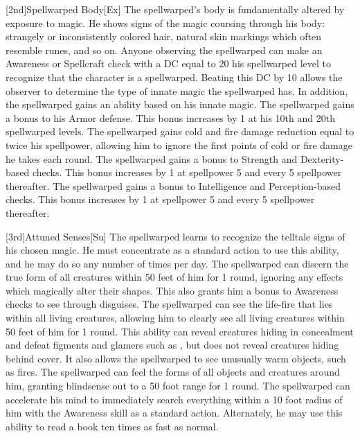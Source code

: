 [2nd]{Spellwarped Body}[Ex]
The spellwarped's body is fundamentally altered by exposure to magic.
He shows signs of the magic coursing through his body: strangely or inconsistently colored hair, natural skin markings which often resemble runes, and so on.
Anyone observing the spellwarped can make an Awareness or Spellcraft check with a DC equal to 20 \sub his spellwarped level to recognize that the character is a spellwarped.
Beating this DC by 10 allows the observer to determine the type of innate magic the spellwarped has.
In addition, the spellwarped gains an ability based on his innate magic.
    The spellwarped gains a  bonus to his Armor defense.
    This bonus increases by 1 at his 10th and 20th spellwarped levels.
    The spellwarped gains cold and fire damage reduction equal to twice his spellpower, allowing him to ignore the first points of cold or fire damage he takes each round.
    The spellwarped gains a  bonus to Strength and Dexterity-based checks.
    This bonus increases by 1 at spellpower 5 and every 5 spellpower thereafter.
    The spellwarped gains a  bonus to Intelligence and Perception-based checks.
    This bonus increases by 1 at spellpower 5 and every 5 spellpower thereafter.

[3rd]{Attuned Senses}[Su]
The spellwarped learns to recognize the telltale signs of his chosen magic.
He must concentrate as a standard action to use this ability, and he may do so any number of times per day.
    The spellwarped can discern the true form of all creatures within 50 feet of him for 1 round, ignoring any effects which magically alter their shapes.
    This also grants him a  bonus to Awareness checks to see through disguises.
    The spellwarped can see the life-fire that lies within all living creatures, allowing him to clearly see all living creatures within 50 feet of him for 1 round.
    This ability can reveal creatures hiding in concealment and defeat figments and glamers such as , but does not reveal creatures hiding behind cover.
    It also allows the spellwarped to see unusually warm objects, such as fires.
    The spellwarped can feel the forms of all objects and creatures around him, granting blindsense out to a 50 foot range for 1 round.
    The spellwarped can accelerate his mind to immediately search everything within a 10 foot radius of him with the Awareness skill as a standard action.
    Alternately, he may use this ability to read a book ten times as fast as normal.

